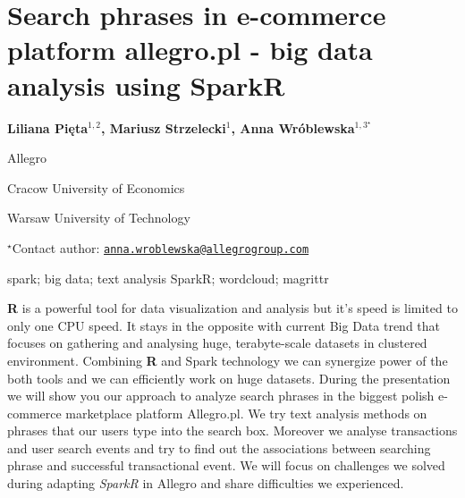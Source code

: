 \documentclass[\main/boa.tex]{subfiles}
\begin{document}
\section{Search phrases in e-commerce platform allegro.pl - big data analysis
using SparkR}

\begin{center}
  {\bf {} Liliana Pięta$^{1, 2}$,  Mariusz Strzelecki$^{1}$,  Anna Wróblewska$^{1, 3^\star}$}
\end{center}

\vskip 0.3cm

\begin{affiliations}
\begin{enumerate}
\begin{minipage}{0.915\textwidth}
\centering
\item Allegro \\[-2pt]
\item Cracow University of Economics \\[-2pt]
\item Warsaw University of Technology \\[-2pt]
\end{minipage}
\end{enumerate}
$^\star$Contact author: \href{mailto:anna.wroblewska@allegrogroup.com}{\nolinkurl{anna.wroblewska@allegrogroup.com}}\\
\end{affiliations}

\vskip 0.5cm

\begin{minipage}{0.915\textwidth}
\keywords spark; big data; text analysis
\packages {} SparkR;  wordcloud;  magrittr
\end{minipage}

\vskip 0.8cm

\textbf{R} is a powerful tool for data visualization and analysis but
it's speed is limited to only one CPU speed. It stays in the opposite
with current Big Data trend that focuses on gathering and analysing
huge, terabyte-scale datasets in clustered environment. Combining
\textbf{R} and Spark technology we can synergize power of the both tools
and we can efficiently work on huge datasets. During the presentation we
will show you our approach to analyze search phrases in the biggest
polish e-commerce marketplace platform Allegro.pl. We try text analysis
methods on phrases that our users type into the search box. Moreover we
analyse transactions and user search events and try to find out the
associations between searching phrase and successful transactional
event. We will focus on challenges we solved during adapting
\emph{SparkR} in Allegro and share difficulties we experienced.
\end{document}
